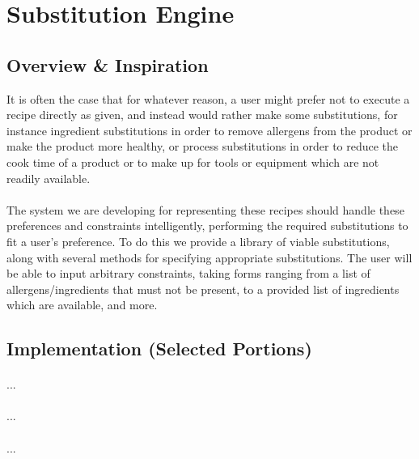 \newpage
\section{Substitution Engine}
\subsection{Overview \& Inspiration}
It is often the case that for whatever reason, a user might prefer not to execute a recipe directly as given, and instead would rather make some substitutions, for instance ingredient substitutions in order to remove allergens from the product or make the product more healthy, or process substitutions in order to reduce the cook time of a product or to make up for tools or equipment which are not readily available.

\paragraph{}
The system we are developing for representing these recipes should handle these preferences and constraints intelligently, performing the required substitutions to fit a user's preference. To do this we provide a library of viable substitutions, along with several methods for specifying appropriate substitutions. The user will be able to input arbitrary constraints, taking forms ranging from a list of allergens/ingredients that must not be present, to a provided list of ingredients which are available, and more.

\subsection{Implementation (Selected Portions)}
\paragraph{}
...
\paragraph{}
...
\paragraph{}
...














